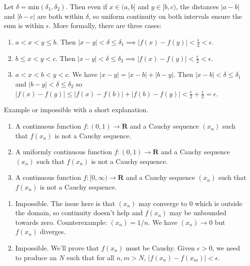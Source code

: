 \documentclass{oxmathproblems}
\begin{document}
\begin{questions}
\begin{solution}
  Let $\delta = \text{min}(\delta_{1}, \delta_{2})$. Then even if $x \in (a, b]$ and $y \in [b, c)$, the distances $|a-b|$ and $|b-c|$ are both within $\delta$, so uniform continuity on both intervals
  ensure the sum is within $\epsilon$. More formally, there are three cases:
  \begin{enumerate}
    \item $a < x < y \leq b$. Then $|x-y| < \delta \leq \delta_{1} \implies |f(x)-f(y)| < \frac{\epsilon}{2} < \epsilon$.
    \item $b \leq x < y < c$. Then $|x-y| < \delta \leq \delta_{2} \implies |f(x)-f(y)| < \frac{\epsilon}{2} < \epsilon$.
    \item $a < x < b < y < c$. We have $|x-y| = |x-b| + |b-y|$. Then $|x-b| < \delta  \leq \delta_{1}$ and $|b-y| < \delta \leq \delta_{2}$
    so $|f(x)-f(y)| \leq |f(x)-f(b)| + |f(b)-f(y)| < \frac{\epsilon}{2} + \frac{\epsilon}{2} = \epsilon$.
  \end{enumerate}
\end{solution}

\miquestion Example or impossible with a short explanation.
\begin{enumerate}[label=(\alph*)]
  \item A continuous function $f: (0, 1) \to \textbf{R}$ and a Cauchy sequence $(x_{n})$ such that $f(x_{n})$ is not a Cauchy sequence.
  \item A uniformly continuous function $f: (0, 1) \to \textbf{R}$ and a Cauchy sequence $(x_{n})$ such that $f(x_{n})$ is not a Cauchy sequence.
  \item A continuous function $f: [0, \infty) \to \textbf{R}$ and a Cauchy sequence $(x_{n})$ such that $f(x_{n})$ is not a Cauchy sequence.
\end{enumerate}

\begin{solution}
  \begin{enumerate}[label=(\alph*)]
    \item Impossible. The issue here is that $(x_{n})$ may converge to 0 which is outside the domain, so continuity doesn't help and $f(x_{n})$ may be unbounded towards zero.
    Counterexample: $(x_{n})=1/n$. We have $(x_{n}) \to 0$ but $f(x_{n})$ diverges.
    \item Impossible. We'll prove that $f(x_{n})$ must be Cauchy. Given $\epsilon > 0$, we need to produce an $N$ such that for all $n, m > N$, $|f(x_{n})-f(x_{m})| < \epsilon$.
    

\end{enumerate}
\end{solution}
\end{questions}
\end{document}
